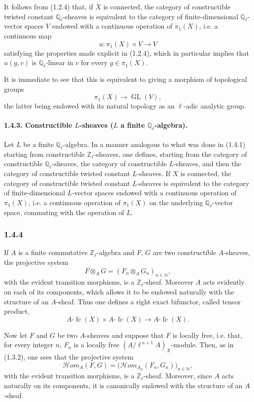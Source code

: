 \documentclass[11pt]{article}
\providecommand{\GL}{\operatorname{GL}}
\providecommand{\cHom}{\mathcal{H}om}
\providecommand{\fc}{\operatorname{fc}}
\begin{document}
It follows from (1.2.4) that, if \(X\) is connected, the category of constructible twisted constant \(\mathbb Q_\ell\)-sheaves is equivalent to the category of finite-dimensional \(\mathbb Q_\ell\)-vector spaces \(V\) endowed with a continuous operation of \(\pi_1(X)\), i.e. a continuous map
\[
u:\pi_1(X)\times V\longrightarrow V
\]
satisfying the properties made explicit in (1.2.4), which in particular implies that \(u(g,v)\) is \(\mathbb Q_\ell\)-linear in \(v\) for every \(g\in\pi_1(X)\).

It is immediate to see that this is equivalent to giving a morphism of topological groups
\[
\pi_1(X)\longrightarrow \GL(V),
\]
the latter being endowed with its natural topology as an \(\ell\)-adic analytic group.

\paragraph{1.4.3. Constructible \(L\)-sheaves (\(L\) a finite \(\mathbb Q_\ell\)-algebra).}
Let \(L\) be a finite \(\mathbb Q_\ell\)-algebra. In a manner analogous to what was done in (1.4.1) starting from constructible \(\mathbb Z_\ell\)-sheaves, one defines, starting from the category of constructible \(\mathbb Q_\ell\)-sheaves, the category of constructible \(L\)-sheaves, and then the category of constructible twisted constant \(L\)-sheaves. If \(X\) is connected, the category of constructible twisted constant \(L\)-sheaves is equivalent to the category of finite-dimensional \(L\)-vector spaces endowed with a continuous operation of \(\pi_1(X)\), i.e. a continuous operation of \(\pi_1(X)\) on the underlying \(\mathbb Q_\ell\)-vector space, commuting with the operation of \(L\).

\subsubsection*{1.4.4}
If \(A\) is a finite commutative \(\mathbb Z_\ell\)-algebra and \(F\), \(G\) are two constructible \(A\)-sheaves, the projective system
\[
F\otimes_A G=(F_n\otimes_A G_n)_{n\in\mathbb N},
\]
with the evident transition morphisms, is a \(\mathbb Z_\ell\)-sheaf. Moreover \(A\) acts evidently on each of its components, which allows it to be endowed naturally with the structure of an \(A\)-sheaf. Thus one defines a right exact bifunctor, called tensor product,
\[
A\text{-}\fc(X)\times A\text{-}\fc(X)\longrightarrow A\text{-}\fc(X).
\]

Now let \(F\) and \(G\) be two \(A\)-sheaves and suppose that \(F\) is locally free, i.e. that, for every integer \(n\), \(F_n\) is a locally free \((A/\ell^{\,n+1}A)_X\)-module. Then, as in (1.3.2), one sees that the projective system
\[
\cHom_A(F,G)=\bigl(\cHom_{A_n}(F_n,G_n)\bigr)_{n\in\mathbb N},
\]
with the evident transition morphisms, is a \(\mathbb Z_\ell\)-sheaf. Moreover, since \(A\) acts naturally on its components, it is canonically endowed with the structure of an \(A\)-sheaf.
\end{document}

